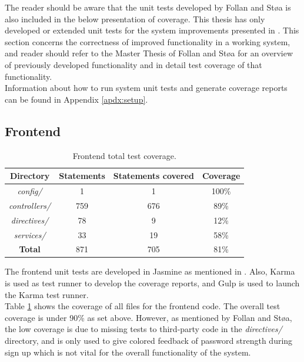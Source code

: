 The reader should be aware that the unit tests developed by Follan and Støa is also included in the below presentation of coverage. This thesis has only developed or extended unit tests for the system improvements presented in . This section concerns the correctness of improved functionality in a working system, and reader should refer to the Master Thesis of Follan and Støa for an overview of previously developed functionality and in detail test coverage of that functionality.  \\

Information about how to run system unit tests and generate coverage reports can be found in Appendix \ref{apdx:setup}.

\subsection{Frontend}
\begin{table}[h!]
    \centering
    \begin{tabular}{c c c c}
      \hline
      \textbf{Directory} & \textbf{Statements} & \textbf{Statements covered} & \textbf{Coverage} \\ \hline
      \textit{config/} & 1 & 1 & 100\% \\
      \textit{controllers/} & 759 & 676 & 89\% \\
      \textit{directives/} & 78 & 9 & 12\% \\
      \textit{services/} & 33 & 19 & 58\% \\ \hline
      \textbf{Total} & 871 & 705 & 81\% \\ \hline
    \end{tabular}
    \caption{Frontend total test coverage.}
    \label{tab:frontend-coverage-all}
\end{table}

The frontend unit tests are developed in Jasmine \cite{JASMINE} as mentioned in . Also, Karma \cite{KARMA} is used as test runner to develop the coverage reports, and Gulp \cite{GULP} is used to launch the Karma test runner.  \\

Table \ref{tab:frontend-coverage-all} shows the coverage of all files for the frontend code. The overall test coverage is under 90\% as set above. However, as mentioned by Follan and Støa, the low coverage is due to missing tests to third-party code in the \textit{directives/} directory, and is only used to give colored feedback of password strength during sign up which is not vital for the overall functionality of the system. \\

